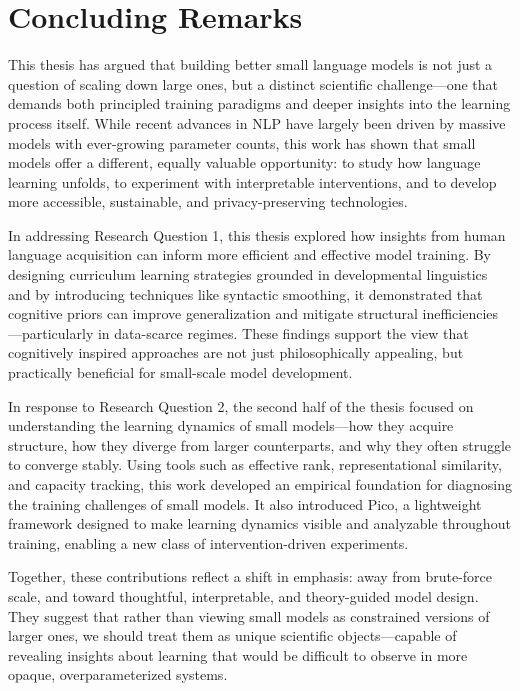 \chapter{Concluding Remarks}

This thesis has argued that building better small language models is not just a question of scaling down large ones, but a distinct scientific challenge—one that demands both principled training paradigms and deeper insights into the learning process itself. While recent advances in NLP have largely been driven by massive models with ever-growing parameter counts, this work has shown that small models offer a different, equally valuable opportunity: to study how language learning unfolds, to experiment with interpretable interventions, and to develop more accessible, sustainable, and privacy-preserving technologies.

In addressing Research Question 1, this thesis explored how insights from human language acquisition can inform more efficient and effective model training. By designing curriculum learning strategies grounded in developmental linguistics and by introducing techniques like syntactic smoothing, it demonstrated that cognitive priors can improve generalization and mitigate structural inefficiencies—particularly in data-scarce regimes. These findings support the view that cognitively inspired approaches are not just philosophically appealing, but practically beneficial for small-scale model development.

In response to Research Question 2, the second half of the thesis focused on understanding the learning dynamics of small models—how they acquire structure, how they diverge from larger counterparts, and why they often struggle to converge stably. Using tools such as effective rank, representational similarity, and capacity tracking, this work developed an empirical foundation for diagnosing the training challenges of small models. It also introduced Pico, a lightweight framework designed to make learning dynamics visible and analyzable throughout training, enabling a new class of intervention-driven experiments.

Together, these contributions reflect a shift in emphasis: away from brute-force scale, and toward thoughtful, interpretable, and theory-guided model design. They suggest that rather than viewing small models as constrained versions of larger ones, we should treat them as unique scientific objects—capable of revealing insights about learning that would be difficult to observe in more opaque, overparameterized systems.

